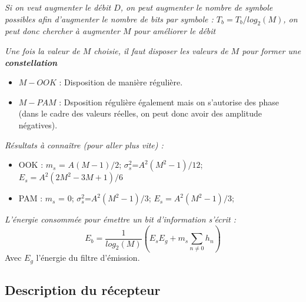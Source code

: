 \begin{pop}
\textit{Si on veut augmenter le débit $D$, on peut augmenter le nombre de symbole possibles afin d'augmenter le nombre de bits par symbole : $T_{b}= T_{b}/log_{2}(M)$, on peut donc chercher à augmenter $M$ pour améliorer le débit}
\end{pop}

\begin{pop}
\textit{Une fois la valeur de $M$ choisie, il faut disposer les valeurs de $M$ pour former une \textbf{constellation}}
\begin{itemize}
\item $M-OOK$ : Disposition de manière régulière.
\item $M-PAM$ : Dsposition régulière également mais on s'autorise des phase (dans le cadre des valeurs réelles, on peut donc avoir des amplitude négatives). 
\end{itemize}
\end{pop}

\begin{pop}
\textit{Résultats à connaître (pour aller plus vite) :}
\begin{itemize}
\item OOK : $m_{s}$ = $A(M-1)/2$;     $\sigma_{s}^{2}$=$A^{2}(M^{2}-1)/12$;     $E_{s}=A^{2}(2M^{2}-3M+1)/6$
\item PAM : $m_{s}$ = 0;    $\sigma_{s}^{2}$=$A^{2}(M^{2}-1)/3$;     $E_{s}=A^{2}(M^{2}-1)/3$;
\end{itemize}
\end{pop}
\begin{pop}
\textit{L'énergie consommée pour émettre un bit d'information s'écrit : }
$$E_{b}=\dfrac{1}{log_{2}(M)} (E_{s}E_{g}+m_{s}\sum_{n\neq 0} h_{n})$$
Avec $E_{g}$ l'énergie du filtre d'émission.
\end{pop}

\subsection{Description du récepteur}
